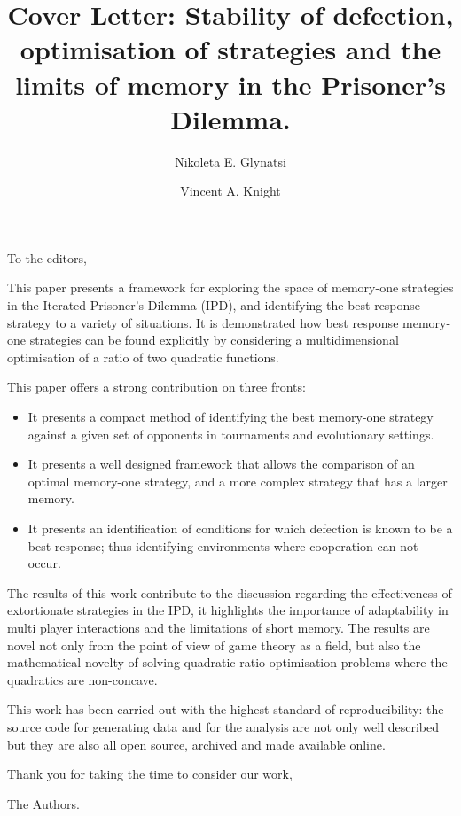 \documentclass{article}
\title{Cover Letter: Stability of defection, optimisation of strategies and the
limits of memory in the Prisoner's Dilemma.}
\author[1]{Nikoleta E. Glynatsi}
\author[1]{Vincent A. Knight}
\affil[1]{Cardiff University, School of Mathematics, Cardiff, United Kingdom}
\date{}
\begin{document}
\maketitle

To the editors,

This paper presents a framework for exploring the space of memory-one strategies
in the Iterated Prisoner's Dilemma (IPD), and identifying the best response
strategy to a variety of situations. It is demonstrated how best response
memory-one strategies can be found explicitly by considering a multidimensional
optimisation of a ratio of two quadratic functions.

This paper offers a strong contribution on three fronts:

\begin{itemize}
    \item It presents a compact method of identifying the best memory-one
    strategy against a given set of opponents in tournaments and evolutionary
    settings.
    \item It presents a well designed framework that allows the comparison of an
          optimal memory-one strategy, and a more complex strategy that has a
          larger memory.
    \item It presents an identification of conditions for which defection is
          known to be a best response; thus identifying environments where
          cooperation can not occur.
\end{itemize}

The results of this work contribute to the discussion regarding the
effectiveness of extortionate strategies in the IPD, it highlights the importance
of adaptability in multi player interactions and the limitations of short memory.
The results are novel not only from the point of view of game theory as
a field, but also the mathematical novelty of solving quadratic ratio
optimisation problems where the quadratics are non-concave.

This work has been carried out with the highest standard of reproducibility: the
source code for generating data and for the analysis are not only well described
but they are also all open source, archived and made available online.

Thank you for taking the time to consider our work,

The Authors.
\end{document}
